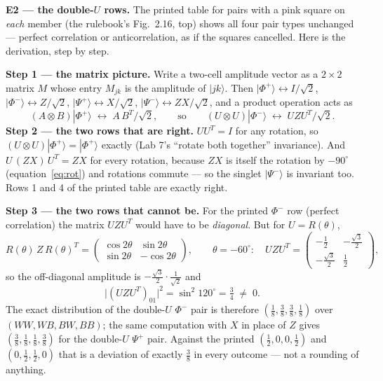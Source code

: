 \documentclass[a4paper,11pt]{article}
\providecommand{\ket}[1]{|#1\rangle}
\begin{document}
\begin{erratumbox}
\textbf{E2 --- the double-$U$ rows.} The printed table for pairs with a pink square on
\emph{each} member (the rulebook's Fig.~2.16, top) shows all four pair types unchanged
--- perfect correlation or anticorrelation, as if the squares cancelled. Here is the
derivation, step by step.

\medskip
\noindent\textbf{Step 1 --- the matrix picture.} Write a two-cell amplitude vector as a
$2 \times 2$ matrix $M$ whose entry $M_{jk}$ is the amplitude of $\ket{jk}$. Then
$\ket{\Phi^+} \leftrightarrow I/\sqrt 2$, $\ket{\Phi^-} \leftrightarrow Z/\sqrt 2$,
$\ket{\Psi^+} \leftrightarrow X/\sqrt 2$, $\ket{\Psi^-} \leftrightarrow ZX/\sqrt 2$, and
a product operation acts as
\begin{equation}
    (A \otimes B)\ket{\Phi^+} \;\leftrightarrow\; A\,B^{T}/\sqrt 2,
    \qquad\text{so}\qquad
    (U \otimes U)\ket{\Phi^-} \;\leftrightarrow\; U Z U^{T}/\sqrt 2 .
    \label{eq:matrixpic}
\end{equation}
\textbf{Step 2 --- the two rows that are right.} $U U^{T} = I$ for any rotation, so
$(U \otimes U)\ket{\Phi^+} = \ket{\Phi^+}$ exactly (Lab 7's ``rotate both together''
invariance). And $U\,(ZX)\,U^{T} = ZX$ for every rotation, because $ZX$ is itself the
rotation by $-90^\circ$ (equation~\eqref{eq:rot}) and rotations commute --- so the singlet $\ket{\Psi^-}$ is
invariant too. Rows 1 and 4 of the printed table are exactly right.

\medskip
\noindent\textbf{Step 3 --- the two rows that cannot be.} For the printed $\Phi^-$
row (perfect correlation) the matrix $U Z U^{T}$ would have to be \emph{diagonal}. But for
$U = R(\theta)$,
\begin{equation}
    R(\theta)\,Z\,R(\theta)^{T} = \begin{pmatrix} \cos 2\theta & \sin 2\theta \\
    \sin 2\theta & -\cos 2\theta \end{pmatrix},
    \qquad \theta = -60^\circ:\quad
    U Z U^{T} = \begin{pmatrix} -\tfrac12 & -\tfrac{\sqrt 3}{2} \\
    -\tfrac{\sqrt 3}{2} & \tfrac12 \end{pmatrix},
    \label{eq:uzut}
\end{equation}
so the off-diagonal amplitude is $-\tfrac{\sqrt 3}{2}\cdot\tfrac{1}{\sqrt 2}$ and
\begin{equation}
    \bigl|(U Z U^{T})_{01}\bigr|^2 = \sin^2 120^\circ = \tfrac34 \;\ne\; 0 .
    \label{eq:obstruction}
\end{equation}
The exact distribution of the double-$U$ $\Phi^-$ pair is therefore
$(\tfrac18, \tfrac38, \tfrac38, \tfrac18)$ over $(WW, WB, BW, BB)$; the same computation
with $X$ in place of $Z$ gives $(\tfrac38, \tfrac18, \tfrac18, \tfrac38)$ for the
double-$U$ $\Psi^+$ pair. Against the printed $(\tfrac12, 0, 0, \tfrac12)$ and
$(0, \tfrac12, \tfrac12, 0)$ that is a deviation of exactly $\tfrac38$ in every outcome
--- not a rounding of anything.


\end{erratumbox}
\end{document}
